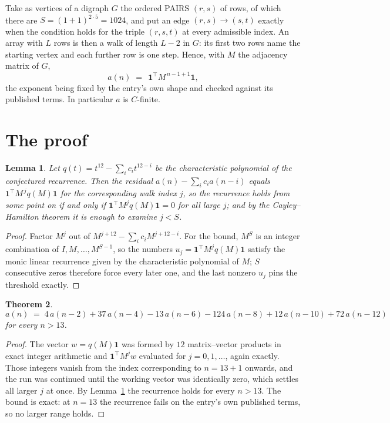 \documentclass[11pt,a4paper]{article}
\theoremstyle{plain}
\newtheorem{theorem}{Theorem}
\newtheorem{lemma}[theorem]{Lemma}
\theoremstyle{definition}
\begin{document}
Take as vertices of a digraph $G$ the ordered PAIRS $(r,s)$ of rows, of which there are
$S=(1+1)^{2\cdot5}=1024$, and put an edge $(r,s)\to(s,t)$ exactly when the condition
holds for the triple $(r,s,t)$ at every admissible index. An array with $L$ rows is then a
walk of length $L-2$ in $G$: its first two rows name the starting vertex and each further
row is one step. Hence, with $M$ the adjacency matrix of $G$,
\[
a(n)\;=\;\,\mathbf{1}^{\!\top}M^{\,n-1+1}\mathbf{1},
\]
the exponent being fixed by the entry's own shape and checked against its published terms.
In particular $a$ is $C$-finite.

\section{The proof}

\begin{lemma}\label{lem:crit}
Let $q(t)=t^{12}-\sum_i c_it^{12-i}$ be the characteristic polynomial of the
conjectured recurrence. Then the residual $a(n)-\sum_ic_ia(n-i)$ equals
$\mathbf{1}^{\!\top}M^{\,j}q(M)\mathbf{1}$ for the corresponding walk index
$j$, so the recurrence holds from some point on if and only if
$\mathbf{1}^{\!\top}M^{j}q(M)\mathbf{1}=0$ for all large $j$; and by the
Cayley--Hamilton theorem it is enough to examine $j<S$.
\end{lemma}

\begin{proof}
Factor $M^{j}$ out of $M^{j+12}-\sum_ic_iM^{j+12-i}$. For the bound, $M^{S}$
is an integer combination of $I,M,\dots,M^{S-1}$, so the numbers
$u_j=\mathbf{1}^{\!\top}M^{j}q(M)\mathbf{1}$ satisfy the monic linear recurrence given by
the characteristic polynomial of $M$; $S$ consecutive zeros therefore force every later one,
and the last nonzero $u_j$ pins the threshold exactly.
\end{proof}

\begin{theorem}
\[
a(n)\;=\;4\,a(n-2) + 37\,a(n-4) - 13\,a(n-6) - 124\,a(n-8) + 12\,a(n-10) + 72\,a(n-12)
\]
for every $n>13$.
\end{theorem}

\begin{proof}
The vector $w=q(M)\mathbf{1}$ was formed by $12$ matrix--vector products in exact
integer arithmetic and $\mathbf{1}^{\!\top}M^{j}w$ evaluated for $j=0,1,\dots$, again
exactly. Those integers vanish from the index corresponding to $n=13+1$ onwards, and the
run was continued until the working vector was identically zero, which settles all larger $j$
at once. By Lemma~\ref{lem:crit} the recurrence holds for every $n>13$. The bound is exact: at $n=13$ the recurrence fails on the entry's own published terms, so no larger range holds.
\end{proof}
\end{document}
